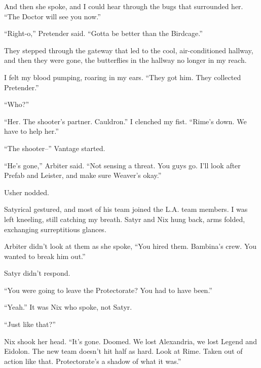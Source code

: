 And then she spoke, and I could hear through the bugs that surrounded her.  ``The Doctor will see you now.''



``Right-o,'' Pretender said.  ``Gotta be better than the Birdcage.''



They stepped through the gateway that led to the cool, air-conditioned hallway, and then they were gone, the butterflies in the hallway no longer in my reach.



I felt my blood pumping, roaring in my ears.  ``They got him.  They collected Pretender.''



``Who?''



``Her.  The shooter's partner.  Cauldron.''  I clenched my fist.  ``Rime's down.  We have to help her.''



``The shooter--'' Vantage started.



``He's gone,'' Arbiter said.  ``Not sensing a threat.  You guys go.  I'll look after Prefab and Leister, and make sure Weaver's okay.''



Usher nodded.



Satyrical gestured, and most of his team joined the L.A. team members.  I was left kneeling, still catching my breath.  Satyr and Nix hung back, arms folded, exchanging surreptitious glances.



Arbiter didn't look at them as she spoke, ``You hired them.  Bambina's crew.  You wanted to break him out.''



Satyr didn't respond.



``You were going to leave the Protectorate?  You had to have been.''



``Yeah.''  It was Nix who spoke, not Satyr.



``Just like that?''



Nix shook her head.  ``It's gone.  Doomed.  We lost Alexandria, we lost Legend and Eidolon.  The new team doesn't hit half as hard.  Look at Rime.  Taken out of action like that.  Protectorate's a shadow of what it was.''




